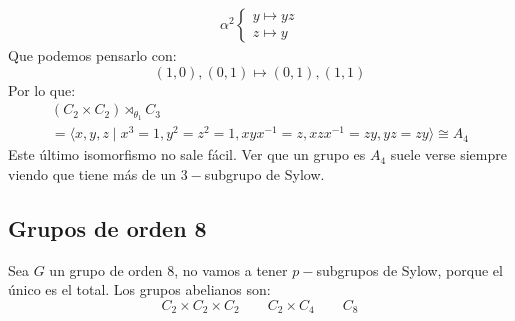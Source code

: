 \begin{itemize}
\begin{itemize}
\begin{gather*}
                    \alpha^2\left\{\begin{array}{l}
                        y\longmapsto yz \\
                        z \longmapsto y
                    \end{array}\right.
                \end{gather*}
                Que podemos pensarlo con:
                \begin{equation*}
                    (1,0), (0,1) \longmapsto (0,1), (1,1)
                \end{equation*}
                Por lo que:
                \begin{multline*}
                    (C_2\times C_2)\rtimes_{\theta_1} C_3 \\ = \langle x,y,z\mid x^3=1, y^2 = z^2 = 1, xyx^{-1}=z, xzx^{-1}=zy, yz = zy \rangle  \cong A_4
                \end{multline*}
                Este último isomorfismo no sale fácil. Ver que un grupo es $A_4$ suele verse siempre viendo que tiene más de un $3-$subgrupo de Sylow.
        \end{itemize}
\end{itemize}

\subsection{Grupos de orden 8}
\noindent
Sea $G$ un grupo de orden 8, no vamos a tener $p-$subgrupos de Sylow, porque el único es el total. Los grupos abelianos son:
\begin{equation*}
    C_2\times C_2\times C_2 \qquad C_2\times C_4 \qquad C_8
\end{equation*}
